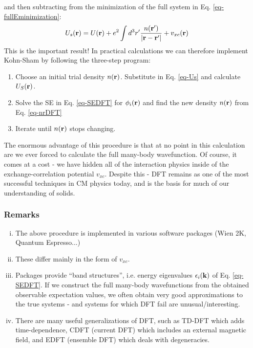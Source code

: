 and then subtracting from the minimization of the full system in Eq. \eqref{eq-fullEminimization}:
\begin{equation}\label{eq-Us}
    U_s(\mathbf{r}) = U(\mathbf{r}) + e^2\int d^3r'\frac{n(\mathbf{r}')}{\lvert \mathbf{r} - \mathbf{r}' \rvert} + v_{xc}(\mathbf{r})
\end{equation}
This is the important result! In practical calculations we can therefore implement Kohn-Sham by following the three-step program:
\begin{enumerate}
    \item Choose an initial trial density $n(\mathbf{r})$. Substitute in Eq. \eqref{eq-Us} and calculate $U_S(\mathbf{r})$. 
    \item Solve the SE in Eq. \eqref{eq-SEDFT} for $\phi_i(\mathbf{r})$ and find the new density $n(\mathbf{r})$ from Eq. \eqref{eq-nrDFT}
    \item Iterate until $n(\mathbf{r})$ stops changing.
\end{enumerate}
The enormous advantage of this procedure is that at no point in this calculation are we ever forced to calculate the full many-body wavefunction. Of course, it comes at a cost - we have hidden all of the interaction physics inside of the exchange-correlation potential $v_{xc}$. Despite this - DFT remains as one of the most successful techniques in CM physics today, and is the basis for much of our understanding of solids.

\subsubsection{Remarks}
\begin{enumerate}[(i)]
    \item The above procedure is implemented in various software packages (Wien 2K, Quantum Espresso...)
    \item These differ mainly in the form of $v_{xc}$. 
    \item Packages provide ``band structures'', i.e. energy eigenvalues $\epsilon_i(\mathbf{k})$ of Eq. \eqref{eq-SEDFT}. If we construct the full many-body wavefunctions from the obtained observable expectation values, we often obtain very good approximations to the true systems - and systems for which DFT fail are unusual/interesting.
    \item There are many useful generalizations of DFT, such as TD-DFT which adds time-dependence, CDFT (current DFT) which includes an external magnetic field, and EDFT (ensemble DFT) which deals with degeneracies.
\end{enumerate}

